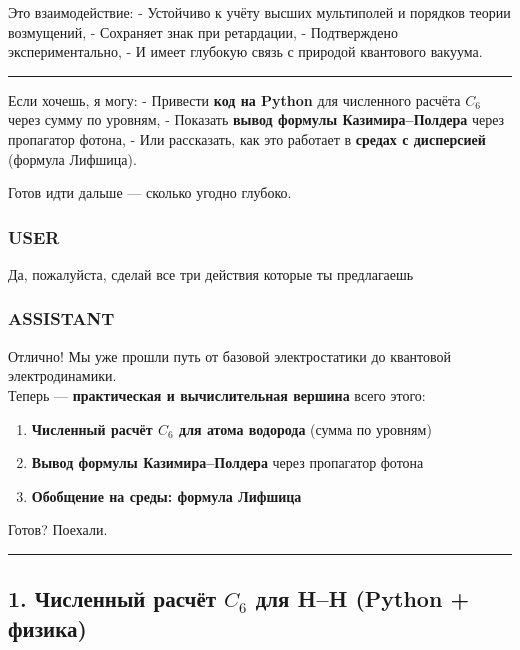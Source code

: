 \documentclass[11pt]{article}
\providecommand{\tightlist}{%
      \setlength{\itemsep}{0pt}\setlength{\parskip}{0pt}}
\begin{document}
Это взаимодействие: - Устойчиво к учёту высших мультиполей и порядков
теории возмущений, - Сохраняет знак при ретардации, - Подтверждено
экспериментально, - И имеет глубокую связь с природой квантового
вакуума.

\begin{center}\rule{0.5\linewidth}{\linethickness}\end{center}

Если хочешь, я могу: - Привести \textbf{код на Python} для численного
расчёта \(C_6\) через сумму по уровням, - Показать \textbf{вывод формулы
Казимира--Полдера} через пропагатор фотона, - Или рассказать, как это
работает в \textbf{средах с дисперсией} (формула Лифшица).

Готов идти дальше --- сколько угодно глубоко.

\subsubsection{USER}\label{user-5}

Да, пожалуйста, сделай все три действия которые ты предлагаешь

\subsubsection{ASSISTANT}\label{assistant-5}

Отлично! Мы уже прошли путь от базовой электростатики до квантовой
электродинамики.\\
Теперь --- \textbf{практическая и вычислительная вершина} всего этого:

\begin{enumerate}
\def\labelenumi{\arabic{enumi}.}
\tightlist
\item
  \textbf{Численный расчёт \(C_6\) для атома водорода} (сумма по
  уровням)\\
\item
  \textbf{Вывод формулы Казимира--Полдера} через пропагатор фотона\\
\item
  \textbf{Обобщение на среды: формула Лифшица}
\end{enumerate}

Готов? Поехали.

\begin{center}\rule{0.5\linewidth}{\linethickness}\end{center}

\subsection{\texorpdfstring{1. Численный расчёт \(C_6\) для H--H (Python
+
физика)}{1. Численный расчёт C\_6 для H--H (Python + физика)}}\label{ux447ux438ux441ux43bux435ux43dux43dux44bux439-ux440ux430ux441ux447ux451ux442-c_6-ux434ux43bux44f-hh-python-ux444ux438ux437ux438ux43aux430}
\end{document}

